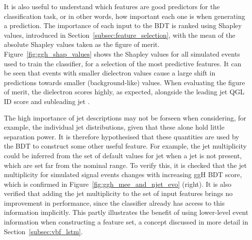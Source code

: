 It is also useful to understand which features are good predictors for the classification task, or in other words, how important each one is when generating a prediction. The importance of each input to the \ggH BDT is ranked using Shapley values, introduced in Section~\ref{subsec:feature_selection}, with the mean of the absolute Shapley values taken as the figure of merit. Figure~\ref{fig:ggh_shap_values} shows the Shapley values for all simulated events used to train the classifier, for a selection of the most predictive features. It can be seen that events with smaller dielectron \pt values cause a large shift in predictions towards smaller (background-like) values. When evaluating the figure of merit, the dielectron \pt scores highly, as expected, alongside the leading jet QGL ID score and subleading jet \pt. 

The high importance of jet descriptions may not be forseen when considering, for example, the individual jet \pt distributions, given that these alone hold little separation power.
It is therefore hypothesised that these quantities are used by the BDT to construct some other useful feature. For example, the jet multiplicity could be inferred from the set of default values for jet \pt when a jet is not present, which are set far from the nominal range. To verify this, it is checked that the jet multiplicity for simulated signal events changes with increasing ggH BDT score, which is confirmed in Figure~\ref{fig:ggh_mee_and_njet_evo} (right). It is also verified that adding the jet multiplicity to the set of input features brings no improvement in performance, since the classifier already has access to this information implicitly. This partly illustrates the benefit of using lower-level event information when constructing a feature set, a concept discussed in more detail in Section~\ref{subsec:vbf_lstm}.

